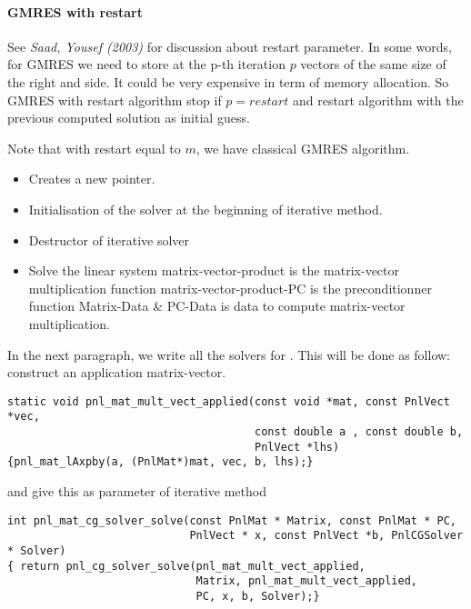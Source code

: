 \paragraph{GMRES with restart}
See {\em Saad, Yousef (2003)} for discussion about restart parameter. In some
words, for GMRES we need to store at the p-th iteration $p$ vectors of the same size of the right
and side. It could be very expensive in term of memory allocation. So GMRES
with restart algorithm stop if $p=restart$ and restart algorithm with the
previous computed solution as initial guess.

Note that with restart equal to $m$, we have classical GMRES algorithm.

\begin{itemize}
\item {}
  \sshortdescribe Creates a new  pointer.  
\item {}
  \sshortdescribe Initialisation of the solver at the beginning of iterative method.  
\item {}
  \sshortdescribe Destructor of iterative solver  
\item {}
  \sshortdescribe Solve the linear system matrix-vector-product is the matrix-vector multiplication function matrix-vector-product-PC is the preconditionner function Matrix-Data \& PC-Data is data to compute matrix-vector multiplication.  
\end{itemize}


In the next paragraph, we write all the solvers for . This will be done as
follow: construct an application matrix-vector.
\begin{verbatim}
static void pnl_mat_mult_vect_applied(const void *mat, const PnlVect *vec, 
                                      const double a , const double b, 
                                      PnlVect *lhs)
{pnl_mat_lAxpby(a, (PnlMat*)mat, vec, b, lhs);}
\end{verbatim}
and give this as parameter of iterative method
\begin{verbatim}
int pnl_mat_cg_solver_solve(const PnlMat * Matrix, const PnlMat * PC, 
                            PnlVect * x, const PnlVect *b, PnlCGSolver * Solver)
{ return pnl_cg_solver_solve(pnl_mat_mult_vect_applied, 
                             Matrix, pnl_mat_mult_vect_applied, 
                             PC, x, b, Solver);}
\end{verbatim}

